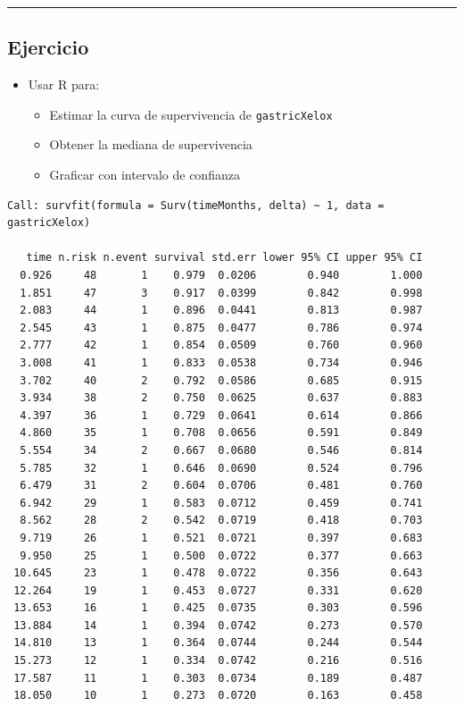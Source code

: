 \documentclass[
]{article}
\providecommand{\tightlist}{%
  \setlength{\itemsep}{0pt}\setlength{\parskip}{0pt}}
\begin{document}
\begin{center}\rule{0.5\linewidth}{0.5pt}\end{center}

\subsection{Ejercicio}\label{ejercicio}

\begin{itemize}
\tightlist
\item
  Usar R para:

  \begin{itemize}
  \tightlist
  \item
    Estimar la curva de supervivencia de \texttt{gastricXelox}
  \item
    Obtener la mediana de supervivencia
  \item
    Graficar con intervalo de confianza
  \end{itemize}
\end{itemize}

\begin{verbatim}
Call: survfit(formula = Surv(timeMonths, delta) ~ 1, data = gastricXelox)

   time n.risk n.event survival std.err lower 95% CI upper 95% CI
  0.926     48       1    0.979  0.0206        0.940        1.000
  1.851     47       3    0.917  0.0399        0.842        0.998
  2.083     44       1    0.896  0.0441        0.813        0.987
  2.545     43       1    0.875  0.0477        0.786        0.974
  2.777     42       1    0.854  0.0509        0.760        0.960
  3.008     41       1    0.833  0.0538        0.734        0.946
  3.702     40       2    0.792  0.0586        0.685        0.915
  3.934     38       2    0.750  0.0625        0.637        0.883
  4.397     36       1    0.729  0.0641        0.614        0.866
  4.860     35       1    0.708  0.0656        0.591        0.849
  5.554     34       2    0.667  0.0680        0.546        0.814
  5.785     32       1    0.646  0.0690        0.524        0.796
  6.479     31       2    0.604  0.0706        0.481        0.760
  6.942     29       1    0.583  0.0712        0.459        0.741
  8.562     28       2    0.542  0.0719        0.418        0.703
  9.719     26       1    0.521  0.0721        0.397        0.683
  9.950     25       1    0.500  0.0722        0.377        0.663
 10.645     23       1    0.478  0.0722        0.356        0.643
 12.264     19       1    0.453  0.0727        0.331        0.620
 13.653     16       1    0.425  0.0735        0.303        0.596
 13.884     14       1    0.394  0.0742        0.273        0.570
 14.810     13       1    0.364  0.0744        0.244        0.544
 15.273     12       1    0.334  0.0742        0.216        0.516
 17.587     11       1    0.303  0.0734        0.189        0.487
 18.050     10       1    0.273  0.0720        0.163        0.458
\end{verbatim}
\end{document}
